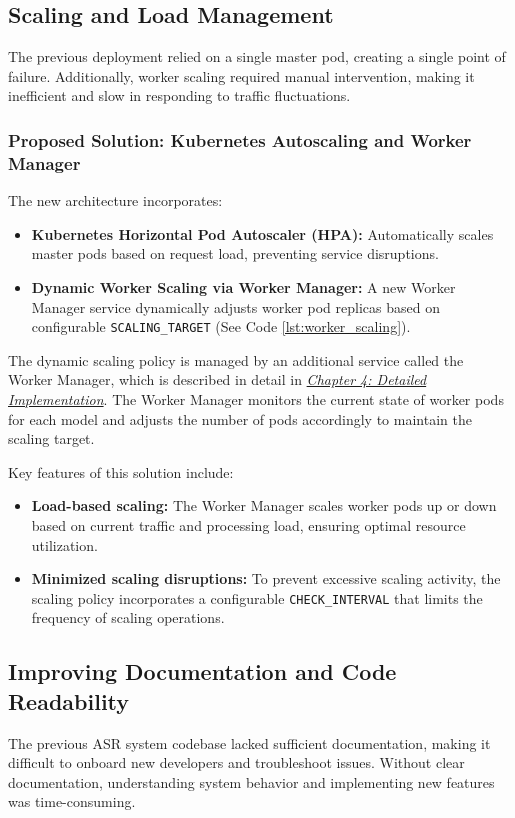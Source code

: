 \subsection{Scaling and Load Management}
The previous deployment relied on a single master pod, creating a single point of failure. Additionally, worker scaling required manual intervention, making it inefficient and slow in responding to traffic fluctuations.

\subsubsection{Proposed Solution: Kubernetes Autoscaling and Worker Manager}
The new architecture incorporates:
\begin{itemize}
    \item \textbf{Kubernetes Horizontal Pod Autoscaler (HPA):} Automatically scales master pods based on request load, preventing service disruptions.
    \item \textbf{Dynamic Worker Scaling via Worker Manager:} A new Worker Manager service dynamically adjusts worker pod replicas based on configurable \texttt{SCALING\_TARGET} (See Code \ref{lst:worker_scaling}).
\end{itemize}

The dynamic scaling policy is managed by an additional service called the Worker Manager, which is described in detail in \hyperref[section:worker_manager]{\textit{Chapter 4: Detailed Implementation}}. The Worker Manager monitors the current state of worker pods for each model and adjusts the number of pods accordingly to maintain the scaling target.

Key features of this solution include:
\begin{itemize}
    \item \textbf{Load-based scaling:}  The Worker Manager scales worker pods up or down based on current traffic and processing load, ensuring optimal resource utilization.
    \item \textbf{Minimized scaling disruptions:}  To prevent excessive scaling activity, the scaling policy incorporates a configurable \texttt{CHECK\_INTERVAL} that limits the frequency of scaling operations.
\end{itemize}

\subsection{Improving Documentation and Code Readability}
The previous ASR system codebase lacked sufficient documentation, making it difficult to onboard new developers and troubleshoot issues. Without clear documentation, understanding system behavior and implementing new features was time-consuming.

